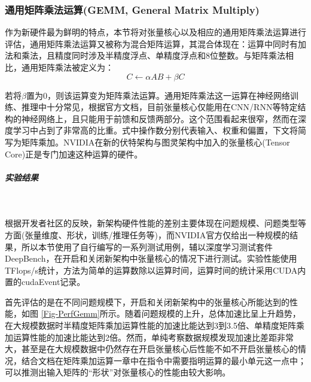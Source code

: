 \subsubsection{通用矩阵乘法运算(GEMM, General Matrix Multiply)}
\par 作为新硬件最为鲜明的特点，本节将对张量核心以及相应的通用矩阵乘法运算进行评估，通用矩阵乘法运算又被称为混合矩阵运算，其混合体现在：运算中同时有加法和乘法，且精度同时涉及半精度浮点、单精度浮点和8位整数。与矩阵乘法相比，通用矩阵乘法被定义为：
$$ C \leftarrow \alpha AB + \beta C $$
\par 若将$ \beta $置为0，则该运算变为矩阵乘法运算。通用矩阵乘法这一运算在神经网络训练、推理中十分常见，根据官方文档，目前张量核心仅能用在CNN/RNN等特定结构的神经网络上，且只能用于前馈和反馈两部分。这个范围看起来很窄，然而在深度学习中占到了非常高的比重。式中操作数分别代表输入、权重和偏置，下文将简写为矩阵乘加。NVIDIA在新的伏特架构与图灵架构中加入的张量核心(Tensor Core)正是专门加速这种运算的硬件。
\subparagraph{实验结果}~{}
\par 根据开发者社区的反映，新架构硬件性能的差别主要体现在问题规模、问题类型等方面(张量维度、形状，训练/推理任务等)，而NVIDIA官方仅给出一种规模的结果，所以本节使用了自行编写的一系列测试用例，辅以深度学习测试套件DeepBench\cite{DEEPBENCH}，在开启和关闭新架构中张量核心的情况下进行测试。实验性能使用TFlops/s统计，方法为简单的运算数除以运算时间，运算时间的统计采用CUDA内置的cudaEvent记录。
\par 首先评估的是在不同问题规模下，开启和关闭新架构中的张量核心所能达到的性能，如图 \ref{Fig-PerfGemm}所示。随着问题规模的上升，总体加速比呈上升趋势，在大规模数据时半精度矩阵乘加运算性能的加速比能达到3到3.5倍、单精度矩阵乘加运算性能的加速比能达到2倍。然而，单纯考察数据规模发现加速比差距非常大，甚至是在大规模数据中仍然存在开启张量核心后性能不如不开启张量核心的情况，结合文档在矩阵乘加运算一章中在指令中需要指明运算的最小单元这一点中\cite{PTX}；可以推测出输入矩阵的“形状”对张量核心的性能由较大影响。
